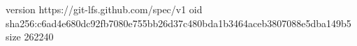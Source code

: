 version https://git-lfs.github.com/spec/v1
oid sha256:c6ad4e680dc92fb7080e755bb26d37c480bda1b3464aceb3807088e5dba149b5
size 262240
